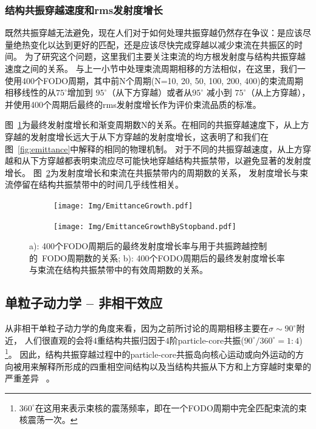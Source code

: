 \subsubsection{结构共振穿越速度和rms发射度增长}
既然共振穿越无法避免，现在人们对于如何处理共振穿越仍然存在争议：是应该尽量绝热变化以达到更好的匹配，还是应该尽快完成穿越以减少束流在共振区的时间。
为了研究这个问题，这里我们主要关注束流的均方根发射度与结构共振穿越速度之间的关系。
与上一小节中处理束流周期相移的方法相似，在这里，我们一使用400个FODO周期，其中前N个周期(N=10, 20, 50, 100, 200, 400)的束流周期相移线性的从$75^\circ$增加到  $95^\circ$（从下方穿越）或者从$95^\circ$ 减小到 $75^\circ$（从上方穿越），
并使用400个周期后最终的rms发射度增长作为评价束流品质的标准。

图~\ref{sfig:CrossingSpeed_byStopband1}为最终发射度增长和渐变周期数N的关系。在相同的共振穿越速度下，从上方穿越的发射度增长远大于从下方穿越的发射度增长，这表明了和我们在图~\ref{fig:emittance}中解释的相同的物理机制。
对于不同的共振穿越速度，从上方穿越和从下方穿越都表明束流应尽可能快地穿越结构共振禁带，以避免显著的发射度增长。
图~\ref{sfig:CrossingSpeed_byStopband2}为发射度增长和束流在共振禁带内的周期数的关系，
发射度增长与束流停留在结构共振禁带中的时间几乎线性相关。

\begin{figure}[thbp]
    \centering
    \begin{subfigure}[b]{0.48\textwidth}
        \texttt{[image: Img/EmittanceGrowth.pdf]}
        \caption{}
        \label{sfig:CrossingSpeed_byStopband1}
    \end{subfigure}
    \begin{subfigure}[b]{0.48\textwidth}
        \texttt{[image: Img/EmittanceGrowthByStopband.pdf]}
        \caption{}
        \label{sfig:CrossingSpeed_byStopband2}
    \end{subfigure}
    \caption{
    a): 400个FODO周期后的最终发射度增长率与用于共振跨越控制的~FODO周期数的关系;
    b): 400个FODO周期后的最终发射度增长率与束流在结构共振禁带中的有效周期数的关系。}
    \label{fig:CrossingSpeed}
\end{figure}

\subsection{单粒子动力学 -- 非相干效应}
\label{section:Crossing_Incoherent}
从非相干单粒子动力学的角度来看，因为之前所讨论的周期相移主要在$\sigma\sim90^\circ$附近，
人们很直观的会将4重结构共振归因于4阶particle-core共振($90^\circ/360^\circ=1:4$)
\footnote{$360^\circ$在这用来表示束核的震荡频率，即在一个FODO周期中完全匹配束流的束核震荡一次。}。
因此，结构共振穿越过程中的particle-core共振岛向核心运动或向外运动的方向被用来解释所形成的四重相空间结构以及当结构共振从下方和上方穿越时束晕的严重差异~\cite{25} 。

